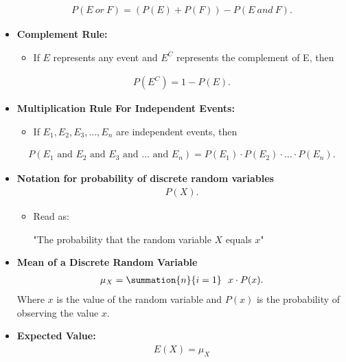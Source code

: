 \documentclass{report}
\begin{document}
\begin{itemize}
          \begin{align*}
            P(E\ or\ F) = (P(E) + P(F)) - P(E\ and\ F)
          .\end{align*}
        \item \textbf{Complement Rule:}
            \begin{itemize}
                \item If $E$ represents any event and $E^{C}$ represents the complement of E, then
            \end{itemize}
            \begin{align*}
                P(E^{C}) = 1-P(E)                
            .\end{align*}
          \item \textbf{Multiplication Rule For Independent Events:}
    \begin{itemize}
      \item If $E_1, E_2, E_3, \ldots, E_n$ are independent events, then
    \end{itemize}
    \begin{align*}
         P(E_1 \text{ and } E_2 \text{ and } E_3 \text{ and } \ldots \text{ and } E_n) = P(E_1) \cdot P(E_2) \cdot \ldots \cdot P(E_n)
    .\end{align*}
            \item \textbf{Notation for probability of discrete random variables}
            \begin{align*}
                P(X)
            .\end{align*}
            \begin{itemize}
                \item Read as:
                    \begin{center}
                        "The probability that the random variable $X $ equals $x $"
                    \end{center}
            \end{itemize}
        \item \textbf{Mean of a Discrete Random Variable}
            \begin{align*}
                \mu_X = \summation{n}{i=1}\ \  x \cdot P(x)
            .\end{align*}
            Where $x $ is the value of the random variable and $P(x)$ is the probability of observing the value $x$.
        \item \textbf{Expected Value:}
            \begin{align*}
                E(X) = \mu_{X}

\end{align*}
\end{itemize}
\end{document}
